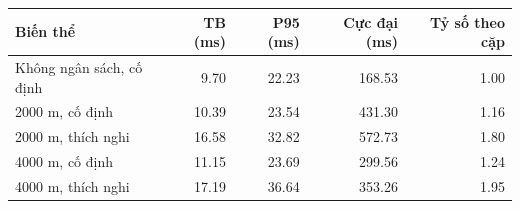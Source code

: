 \begin{tabular}{lrrrr}
\toprule
Biến thể & TB (ms) & P95 (ms) & Cực đại (ms) & Tỷ số theo cặp \\
\midrule
Không ngân sách, cố định & 9.70 & 22.23 & 168.53 & 1.00 \\
2000 m, cố định & 10.39 & 23.54 & 431.30 & 1.16 \\
2000 m, thích nghi & 16.58 & 32.82 & 572.73 & 1.80 \\
4000 m, cố định & 11.15 & 23.69 & 299.56 & 1.24 \\
4000 m, thích nghi & 17.19 & 36.64 & 353.26 & 1.95 \\
\bottomrule
\end{tabular}
